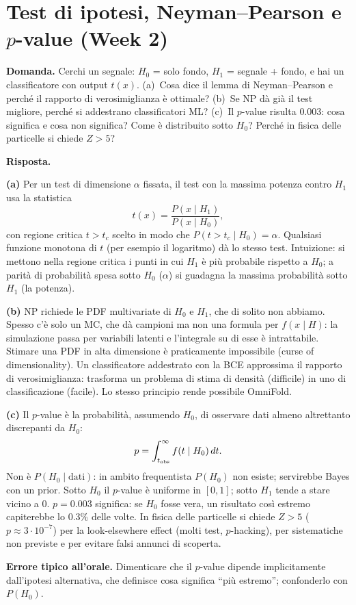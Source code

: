 \documentclass[11pt,a4paper]{article}
\newcommand{\Dom}[1]{\par\medskip\noindent\textbf{Domanda.} #1\par\nopagebreak}
\newcommand{\Ris}[1]{\noindent\textbf{Risposta.}\par\nopagebreak #1}
\newcommand{\Trap}[1]{\par\smallskip\noindent\textbf{Errore tipico all'orale.} #1\par}
\begin{document}
\section{Test di ipotesi, Neyman--Pearson e $p$-value (Week 2)}

\Dom{Cerchi un segnale: $H_0$ = solo fondo, $H_1$ = segnale + fondo, e hai un classificatore con output $t(x)$.
(a)~Cosa dice il lemma di Neyman--Pearson e perch\'e il rapporto di verosimiglianza \`e ottimale?
(b)~Se NP d\`a gi\`a il test migliore, perch\'e si addestrano classificatori ML?
(c)~Il $p$-value risulta $0.003$: cosa significa e cosa non significa? Come \`e distribuito sotto $H_0$? Perch\'e in fisica delle particelle si chiede $Z>5$?}

\Ris{
\textbf{(a)} Per un test di dimensione $\alpha$ fissata, il test con la massima potenza contro $H_1$ usa la statistica
\[
t(x)=\frac{P(x\mid H_1)}{P(x\mid H_0)},
\]
con regione critica $t>t_c$ scelto in modo che $P(t>t_c\mid H_0)=\alpha$. Qualsiasi funzione monotona di $t$ (per esempio il logaritmo) d\`a lo stesso test.
Intuizione: si mettono nella regione critica i punti in cui $H_1$ \`e pi\`u probabile rispetto a $H_0$; a parit\`a di probabilit\`a spesa sotto $H_0$ ($\alpha$) si guadagna la massima probabilit\`a sotto $H_1$ (la potenza).

\textbf{(b)} NP richiede le PDF multivariate di $H_0$ e $H_1$, che di solito non abbiamo. Spesso c'\`e solo un MC, che d\`a campioni ma non una formula per $f(x\mid H)$: la simulazione passa per variabili latenti e l'integrale su di esse \`e intrattabile.
Stimare una PDF in alta dimensione \`e praticamente impossibile (curse of dimensionality).
Un classificatore addestrato con la BCE approssima il rapporto di verosimiglianza: trasforma un problema di stima di densit\`a (difficile) in uno di classificazione (facile). Lo stesso principio rende possibile OmniFold.

\textbf{(c)} Il $p$-value \`e la probabilit\`a, assumendo $H_0$, di osservare dati almeno altrettanto discrepanti da $H_0$:
\[
p=\int_{t_{\rm obs}}^{\infty} f(t\mid H_0)\,dt .
\]
Non \`e $P(H_0\mid\text{dati})$: in ambito frequentista $P(H_0)$ non esiste; servirebbe Bayes con un prior.
Sotto $H_0$ il $p$-value \`e uniforme in $[0,1]$; sotto $H_1$ tende a stare vicino a $0$.
$p=0.003$ significa: se $H_0$ fosse vera, un risultato cos\`i estremo capiterebbe lo $0.3\%$ delle volte.
In fisica delle particelle si chiede $Z>5$ ($p\approx3\cdot10^{-7}$) per la look-elsewhere effect (molti test, $p$-hacking), per sistematiche non previste e per evitare falsi annunci di scoperta.
}
\Trap{Dimenticare che il $p$-value dipende implicitamente dall'ipotesi alternativa, che definisce cosa significa ``pi\`u estremo''; confonderlo con $P(H_0)$.}
\end{document}
